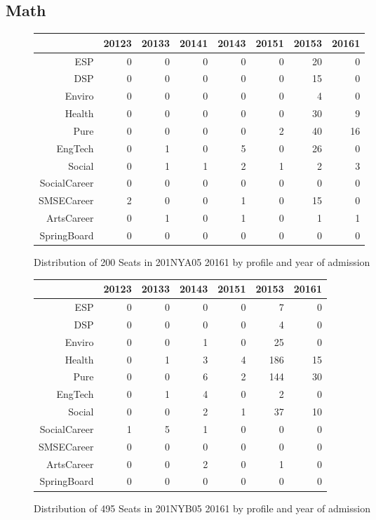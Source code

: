 \documentclass{article}\usepackage[]{graphicx}\usepackage[]{color}
\begin{document}
\subsection{Math}
\begin{figure}[H]
\centering
\begin{tabular}{rrrrrrrr}
  \hline
 & 20123 & 20133 & 20141 & 20143 & 20151 & 20153 & 20161 \\ 
  \hline
ESP &   0 &   0 &   0 &   0 &   0 &  20 &   0 \\ 
  DSP &   0 &   0 &   0 &   0 &   0 &  15 &   0 \\ 
  Enviro &   0 &   0 &   0 &   0 &   0 &   4 &   0 \\ 
  Health &   0 &   0 &   0 &   0 &   0 &  30 &   9 \\ 
  Pure &   0 &   0 &   0 &   0 &   2 &  40 &  16 \\ 
  EngTech &   0 &   1 &   0 &   5 &   0 &  26 &   0 \\ 
  Social &   0 &   1 &   1 &   2 &   1 &   2 &   3 \\ 
  SocialCareer &   0 &   0 &   0 &   0 &   0 &   0 &   0 \\ 
  SMSECareer &   2 &   0 &   0 &   1 &   0 &  15 &   0 \\ 
  ArtsCareer &   0 &   1 &   0 &   1 &   0 &   1 &   1 \\ 
  SpringBoard &   0 &   0 &   0 &   0 &   0 &   0 &   0 \\ 
   \hline
\end{tabular}
\caption{Distribution of 200 Seats in 201NYA05 20161 by profile and year of admission} 
\end{figure}
\begin{figure}[H]
\centering
\begin{tabular}{rrrrrrr}
  \hline
 & 20123 & 20133 & 20143 & 20151 & 20153 & 20161 \\ 
  \hline
ESP &   0 &   0 &   0 &   0 &   7 &   0 \\ 
  DSP &   0 &   0 &   0 &   0 &   4 &   0 \\ 
  Enviro &   0 &   0 &   1 &   0 &  25 &   0 \\ 
  Health &   0 &   1 &   3 &   4 & 186 &  15 \\ 
  Pure &   0 &   0 &   6 &   2 & 144 &  30 \\ 
  EngTech &   0 &   1 &   4 &   0 &   2 &   0 \\ 
  Social &   0 &   0 &   2 &   1 &  37 &  10 \\ 
  SocialCareer &   1 &   5 &   1 &   0 &   0 &   0 \\ 
  SMSECareer &   0 &   0 &   0 &   0 &   0 &   0 \\ 
  ArtsCareer &   0 &   0 &   2 &   0 &   1 &   0 \\ 
  SpringBoard &   0 &   0 &   0 &   0 &   0 &   0 \\ 
   \hline
\end{tabular}
\caption{Distribution of 495 Seats in 201NYB05 20161 by profile and year of admission} 
\end{figure}
\end{document}
